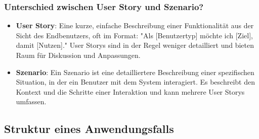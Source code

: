 \documentclass[main.tex]{subfiles}
\begin{document}
\subsubsection*{Unterschied zwischen \gls{User Story} und \gls{Szenario}?}
\begin{itemize}
    \item \textbf{\gls{User Story}}: Eine kurze, einfache Beschreibung einer Funktionalität aus der Sicht des Endbenutzers, oft im Format: "Als [Benutzertyp] möchte ich [Ziel], damit [Nutzen]." \glspl{User Story} sind in der Regel weniger detailliert und bieten Raum für Diskussion und Anpassungen.
    \item \textbf{\gls{Szenario}}: Ein \gls{Szenario} ist eine detailliertere Beschreibung einer spezifischen Situation, in der ein Benutzer mit dem System interagiert. Es beschreibt den Kontext und die Schritte einer Interaktion und kann mehrere \glspl{User Story} umfassen.
\end{itemize}

\subsection{Struktur eines Anwendungsfalls}
\end{document}
